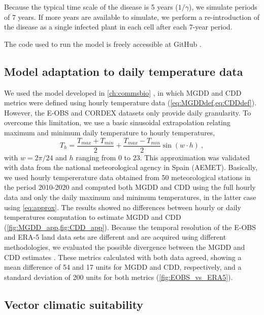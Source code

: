 Because the typical time scale of the disease is 5 years ($1/\gamma$), we
simulate periods of 7 years. If more years are available
to simulate, we perform a re-introduction of the disease as a single infected
plant in each cell after each 7-year period.

The code used to run the model is freely accessible at GitHub
\cite{CODE_model}.

\subsection{Model adaptation to daily temperature data}

We used the model developed in \cref{ch:commsbio}
\cite{GimenezRomero2022_CommsBio}, in which MGDD and CDD metrics were defined
using hourly temperature data (\cref{eq:MGDDdef,eq:CDDdef}). However, the E-OBS
and CORDEX datasets only provide daily granularity. To overcome this
limitation, we use a basic sinusoidal extrapolation relating maximum and
minimum daily temperature to hourly temperatures,
\begin{equation}\label{eq:approx}
    T_h=\frac{T_{max}+T_{min}}{2} + \frac{T_{max}-T_{min}}{2}\sin(w\cdot h)
    \ ,
\end{equation}
with $w=2\pi/24$ and $h$ ranging from $0$ to $23$. This approximation was
validated with data from the national meteorological agency in Spain (AEMET).
Basically, we used hourly tempererature data obtained from 50 meteorological
stations in the period 2010-2020 and computed both MGDD and CDD using the full
hourly data and only the daily maximum and minimum temperatures, in the latter
case using \cref{eq:approx}. The results showed no differences between hourly
or daily temperatures computation to estimate MGDD and CDD
(\cref{fig:MGDD_app,fig:CDD_app}). Because the temporal resolution
of the E-OBS and ERA-5 land data sets are different and are acquired using
different methodologies, we evaluated the possible divergence between the MGDD
and CDD estimates  \cite{GimenezRomero2022_CommsBio}. These metrics calculated
with both data agreed, showing a mean difference of 54 and 17 units for MGDD
and CDD, respectively, and a standard deviation of 200 units for both metrics
(\cref{fig:EOBS_vs_ERA5}).

\subsection{Vector climatic suitability}


